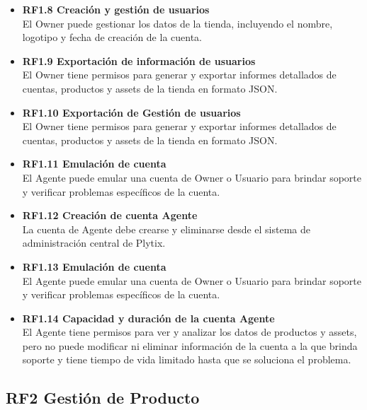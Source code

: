 \documentclass{article}
\begin{document}
\begin{itemize}
    \item \textbf{RF1.8 Creación y gestión de usuarios} \\
    El Owner puede gestionar los datos de la tienda, incluyendo el nombre, logotipo y fecha de creación de la cuenta.

    \item \textbf{RF1.9 Exportación de información de usuarios} \\
    El Owner tiene permisos para generar y exportar informes detallados de cuentas, productos y assets de la tienda en formato JSON.

    \item \textbf{RF1.10 Exportación de Gestión de usuarios} \\
    El Owner tiene permisos para generar y exportar informes detallados de cuentas, productos y assets de la tienda en formato JSON.

    \item \textbf{RF1.11 Emulación de cuenta} \\
    El Agente puede emular una cuenta de Owner o Usuario para brindar soporte y verificar problemas específicos de la cuenta.

    \item \textbf{RF1.12 Creación de cuenta Agente} \\
    La cuenta de Agente debe crearse y eliminarse desde el sistema de administración central de Plytix.

    \item \textbf{RF1.13 Emulación de cuenta} \\
    El Agente puede emular una cuenta de Owner o Usuario para brindar soporte y verificar problemas específicos de la cuenta.

    \item \textbf{RF1.14 Capacidad y duración de la cuenta Agente} \\
    El Agente tiene permisos para ver y analizar los datos de productos y assets, pero no puede modificar ni eliminar información de la cuenta a la que brinda soporte y tiene tiempo de vida limitado hasta que se soluciona el problema.
\end{itemize}

\subsection{RF2 Gestión de Producto}
\end{document}

